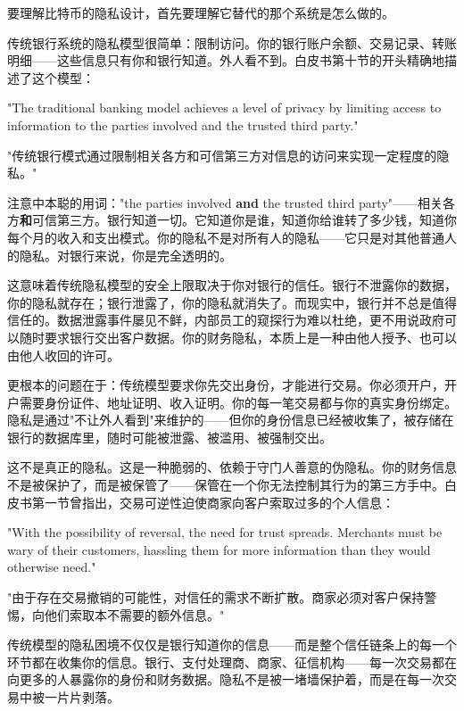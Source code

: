 \documentclass[a4paper,12pt,openany]{ctexbook}
\newenvironment{quoting}{%
  \par\vspace{0.5em}%
  \begin{list}{}{%
    \setlength{\leftmargin}{2em}%
    \setlength{\rightmargin}{2em}%
    \setlength{\parsep}{0.3em}%
    \setlength{\itemsep}{0pt}%
    \setlength{\topsep}{0pt}%
  }%
  \item\relax
}{%
  \end{list}%
  \par\vspace{0.5em}%
}
\begin{document}
要理解比特币的隐私设计，首先要理解它替代的那个系统是怎么做的。

传统银行系统的隐私模型很简单：限制访问。你的银行账户余额、交易记录、转账明细——这些信息只有你和银行知道。外人看不到。白皮书第十节的开头精确地描述了这个模型：


\begin{quoting}
\small
"The traditional banking model achieves a level of privacy by limiting access to information to the parties involved and the trusted third party."

"传统银行模式通过限制相关各方和可信第三方对信息的访问来实现一定程度的隐私。"
\end{quoting}


注意中本聪的用词："the parties involved \textbf{and} the trusted third party"——相关各方\textbf{和}可信第三方。银行知道一切。它知道你是谁，知道你给谁转了多少钱，知道你每个月的收入和支出模式。你的隐私不是对所有人的隐私——它只是对其他普通人的隐私。对银行来说，你是完全透明的。

这意味着传统隐私模型的安全上限取决于你对银行的信任。银行不泄露你的数据，你的隐私就存在；银行泄露了，你的隐私就消失了。而现实中，银行并不总是值得信任的。数据泄露事件屡见不鲜，内部员工的窥探行为难以杜绝，更不用说政府可以随时要求银行交出客户数据。你的财务隐私，本质上是一种由他人授予、也可以由他人收回的许可。

更根本的问题在于：传统模型要求你先交出身份，才能进行交易。你必须开户，开户需要身份证件、地址证明、收入证明。你的每一笔交易都与你的真实身份绑定。隐私是通过"不让外人看到"来维护的——但你的身份信息已经被收集了，被存储在银行的数据库里，随时可能被泄露、被滥用、被强制交出。

这不是真正的隐私。这是一种脆弱的、依赖于守门人善意的伪隐私。你的财务信息不是被保护了，而是被保管了——保管在一个你无法控制其行为的第三方手中。白皮书第一节曾指出，交易可逆性迫使商家向客户索取过多的个人信息：


\begin{quoting}
\small
"With the possibility of reversal, the need for trust spreads. Merchants must be wary of their customers, hassling them for more information than they would otherwise need."

"由于存在交易撤销的可能性，对信任的需求不断扩散。商家必须对客户保持警惕，向他们索取本不需要的额外信息。"
\end{quoting}


传统模型的隐私困境不仅仅是银行知道你的信息——而是整个信任链条上的每一个环节都在收集你的信息。银行、支付处理商、商家、征信机构——每一次交易都在向更多的人暴露你的身份和财务数据。隐私不是被一堵墙保护着，而是在每一次交易中被一片片剥落。
\end{document}
